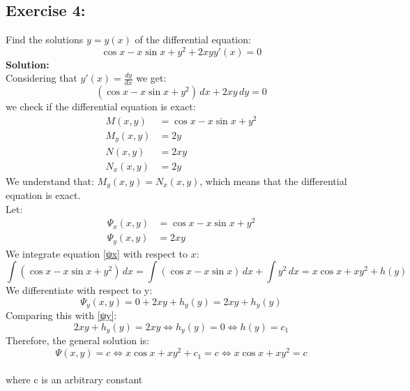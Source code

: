 \documentclass{article}
\begin{document}
\subsection{Exercise 4:} 
Find the solutions $y = y(x)$ of the differential equation:
$$\cos x-x\sin x +y^2+2xyy'(x) = 0$$
\textbf{Solution:} \\
Considering that $y'(x) = \frac{dy}{dx} $ we get:
$$(\cos x-x\sin x+y^2)\,dx+2xy\,dy = 0$$
we check if the differential equation is exact:
\begin{align*}
    M(x,y) &= \cos x-x\sin x+y^2 \\
    M_{y}(x,y) &= 2y \\
    N(x,y) &= 2xy \\
    N_{x}(x,y) &= 2y     
\end{align*}
We understand that:
$M_{y}(x,y) = N_{x}(x,y)$, which means that the differential equation is exact. \\
Let:
\begin{align}
    \Psi_{x}(x,y) &= \cos x-x\sin x+y^2  \label{ψx} \\
    \Psi_{y}(x,y) &= 2xy \label{ψy}
\end{align}
We integrate equation \eqref{ψx} with respect to $x$: \\
$$\int(\cos x-x\sin x+y^2)\,dx = \int(\cos x-x\sin x)\,dx+\int y^2\,dx = x\cos x+xy^2+h(y)$$
We differentiate with respect to y:
$$\Psi_{y}(x,y) = 0+2xy+h_{y}(y) = 2xy+h_{y}(y)$$
Comparing this with \eqref{ψy}:
$$2xy+h_{y}(y) = 2xy \iff h_{y}(y) = 0 \iff h(y) = c_1$$
Therefore, the general solution is:
$$\Psi(x,y) = c \iff x\cos x+xy^2+c_1 = c \iff x\cos x+xy^2 = c$$ \\
where c is an arbitrary constant

\newpage
\end{document}
